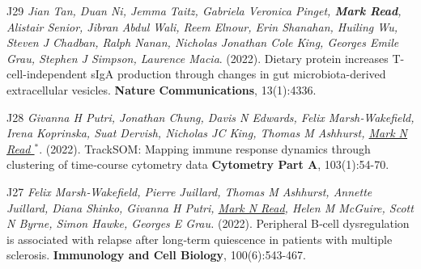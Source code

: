 \documentclass[a4paper]{article}
\begin{document}
\item[J29]
\textit{Jian Tan, Duan Ni, Jemma Taitz, Gabriela Veronica Pinget, \textbf{Mark Read}, Alistair Senior, Jibran Abdul Wali, Reem Elnour, Erin Shanahan, Huiling Wu, Steven J Chadban, Ralph Nanan, Nicholas Jonathan Cole King, Georges Emile Grau, Stephen J Simpson, Laurence Macia}.
(2022).
Dietary protein increases T-cell-independent sIgA production through changes in gut microbiota-derived extracellular vesicles.
\textbf{Nature Communications}, 13(1):4336.

\item[J28]
\textit{Givanna H Putri, Jonathan Chung, Davis N Edwards, Felix Marsh‐Wakefield, Irena Koprinska, Suat Dervish, Nicholas JC King, Thomas M Ashhurst, \underline{Mark N Read $^{*}$}}.
(2022).
TrackSOM: Mapping immune response dynamics through clustering of time‐course cytometry data
\textbf{Cytometry Part A}, 103(1):54-70.

\item[J27]
\textit{Felix Marsh‐Wakefield, Pierre Juillard, Thomas M Ashhurst, Annette Juillard, Diana Shinko, Givanna H Putri, \underline{Mark N Read}, Helen M McGuire, Scott N Byrne, Simon Hawke, Georges E Grau.}
(2022).
Peripheral B‐cell dysregulation is associated with relapse after long‐term quiescence in patients with multiple sclerosis.
\textbf{Immunology and Cell Biology}, 100(6):543-467.

\end{document}
